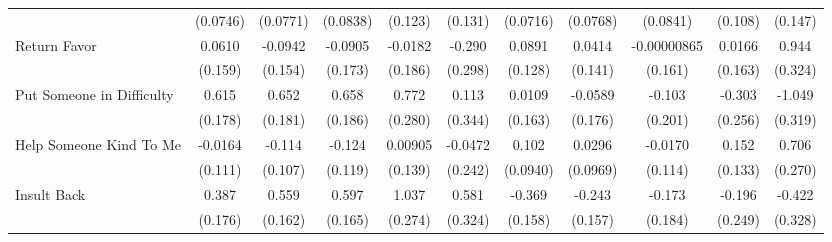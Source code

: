 {\begin{tabular}{l*{10}{c}}
            &    (0.0746)         &    (0.0771)         &    (0.0838)         &     (0.123)         &     (0.131)         &    (0.0716)         &    (0.0768)         &    (0.0841)         &     (0.108)         &     (0.147)         \\
\addlinespace
Return Favor&      0.0610         &     -0.0942         &     -0.0905         &     -0.0182         &      -0.290         &      0.0891         &      0.0414         & -0.00000865         &      0.0166         &       0.944\sym{**} \\
            &     (0.159)         &     (0.154)         &     (0.173)         &     (0.186)         &     (0.298)         &     (0.128)         &     (0.141)         &     (0.161)         &     (0.163)         &     (0.324)         \\
\addlinespace
Put Someone in Difficulty&       0.615\sym{***}&       0.652\sym{***}&       0.658\sym{***}&       0.772\sym{**} &       0.113         &      0.0109         &     -0.0589         &      -0.103         &      -0.303         &      -1.049\sym{***}\\
            &     (0.178)         &     (0.181)         &     (0.186)         &     (0.280)         &     (0.344)         &     (0.163)         &     (0.176)         &     (0.201)         &     (0.256)         &     (0.319)         \\
\addlinespace
Help Someone Kind To Me&     -0.0164         &      -0.114         &      -0.124         &     0.00905         &     -0.0472         &       0.102         &      0.0296         &     -0.0170         &       0.152         &       0.706\sym{**} \\
            &     (0.111)         &     (0.107)         &     (0.119)         &     (0.139)         &     (0.242)         &    (0.0940)         &    (0.0969)         &     (0.114)         &     (0.133)         &     (0.270)         \\
\addlinespace
Insult Back &       0.387\sym{*}  &       0.559\sym{***}&       0.597\sym{***}&       1.037\sym{***}&       0.581         &      -0.369\sym{*}  &      -0.243         &      -0.173         &      -0.196         &      -0.422         \\
            &     (0.176)         &     (0.162)         &     (0.165)         &     (0.274)         &     (0.324)         &     (0.158)         &     (0.157)         &     (0.184)         &     (0.249)         &     (0.328)         \\
\bottomrule
\end{tabular}
}
